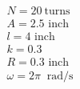 \documentclass[preview]{standalone}
\begin{document}
\begin{align*}
N = 20\ \text{turns}\\A = 2.5\text{ inch}\\l = 4\text{ inch}\\k = 0.3\\R = 0.3\text{ inch}\\\omega = 2\pi\ \text{ rad/s}
\end{align*}
\end{document}
